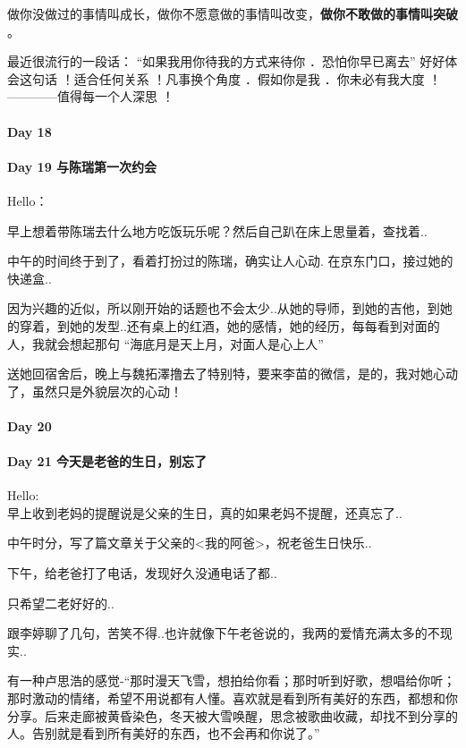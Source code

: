 \documentclass[UTF8,a4paper,8pt]{ctexbook}
\begin{document}
	 	 做你没做过的事情叫成长，做你不愿意做的事情叫改变，\textbf{做你不敢做的事情叫突破} 。
	 	 
	 	 最近很流行的一段话： “如果我用你待我的方式来待你 ．恐怕你早已离去”  好好体会这句话 ！适合任何关系 ！凡事换个角度 ．假如你是我 ．你未必有我大度 ！                   ————值得每一个人深思 ！
 	 \paragraph{Day 18      \quad     }
 	 \paragraph{Day 19  与陈瑞第一次约会   \quad     }
	 	 Hello：
	 	 
	 	 早上想着带陈瑞去什么地方吃饭玩乐呢？然后自己趴在床上思量着，查找着..
	 	 
	 	 中午的时间终于到了，看着打扮过的陈瑞，确实让人心动. 在京东门口，接过她的快递盒..
	 	 
	 	 因为兴趣的近似，所以刚开始的话题也不会太少..从她的导师，到她的吉他，到她的穿着，到她的发型..还有桌上的红酒，她的感情，她的经历，每每看到对面的人，我就会想起那句 “海底月是天上月，对面人是心上人”
	 	 
	 	 送她回宿舍后，晚上与魏拓澤撸去了特别特，要来李苗的微信，是的，我对她心动了，虽然只是外貌层次的心动！
 	 \paragraph{Day 20      \quad     }
 	 \paragraph{Day 21  今天是老爸的生日，别忘了    \quad     }Hello:\\
	 	 早上收到老妈的提醒说是父亲的生日，真的如果老妈不提醒，还真忘了..
	 	 
	 	 中午时分，写了篇文章关于父亲的<我的阿爸>，祝老爸生日快乐..
	 	 
	 	 下午，给老爸打了电话，发现好久没通电话了都..
	 	 
	 	 只希望二老好好的..
	 	 
	 	 跟李婷聊了几句，苦笑不得..也许就像下午老爸说的，我两的爱情充满太多的不现实..
	 	 
	 	 有一种卢思浩的感觉-“那时漫天飞雪，想拍给你看；那时听到好歌，想唱给你听；那时激动的情绪，希望不用说都有人懂。喜欢就是看到所有美好的东西，都想和你分享。后来走廊被黄昏染色，冬天被大雪唤醒，思念被歌曲收藏，却找不到分享的人。告别就是看到所有美好的东西，也不会再和你说了。”
	 	 
\end{document}

